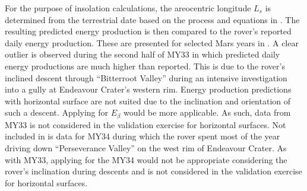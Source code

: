 For the purpose of insolation calculations, the areocentric longitude $L_{s}$ is determined from the terrestrial date based on the process and equations in . The resulting predicted energy production is then compared to the rover's reported daily energy production. These are presented for selected Mars years in . A clear outlier is observed during the second half of \ac{MY}33 in which predicted daily energy productions are much higher than reported. This is due to the rover's inclined descent through ``Bitterroot Valley'' during an intensive investigation into a gully at Endeavour Crater's western rim. Energy production predictions with horizontal surface  are not suited due to the inclination and orientation of such a descent. Applying  for $E_{\beta}$ would be more applicable. As such, data from \ac{MY}33 is not considered in the validation exercise for horizontal surfaces. Not included in  is data for \ac{MY}34 during which the rover spent most of the year driving down ``Perseverance Valley'' on the west rim of Endeavour Crater. As with \ac{MY}33, applying  for the \ac{MY}34 would not be appropriate considering the rover's inclination during descents and is not considered in the validation exercise for horizontal surfaces.

